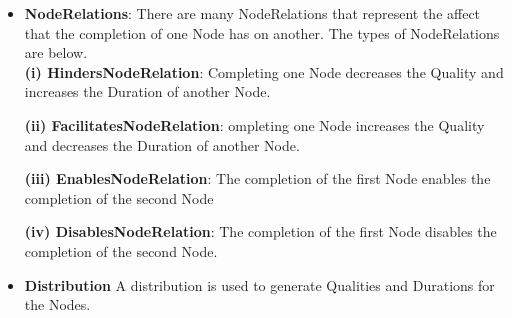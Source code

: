 \begin{enumerate}
\begin{itemize}
\item \textbf{NodeRelations}: There are many NodeRelations that represent the affect that the completion of one Node has on another. The types of NodeRelations are below. \\

\subitem \textbf{(i) HindersNodeRelation}: Completing one Node decreases the Quality and increases the Duration of another Node.

\subitem \textbf{(ii) FacilitatesNodeRelation}: ompleting one Node increases the Quality and decreases the Duration of another Node.

\subitem \textbf{(iii) EnablesNodeRelation}: The completion of the first Node enables the completion of the second Node

\subitem \textbf{(iv) DisablesNodeRelation}: The completion of the first Node disables the completion of the second Node.

\item \textbf{Distribution}  A distribution is used to generate Qualities and Durations for the Nodes.


\end{itemize}
\end{enumerate}